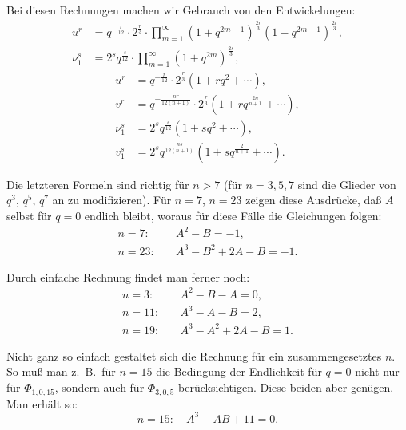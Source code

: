 \documentclass[12pt,a4paper]{article}
\theoremstyle{definition}
\begin{document}
Bei diesen Rechnungen machen wir Gebrauch von den Entwickelungen:
\[
\begin{aligned}
u^r &= q^{-\frac{r}{12}} \cdot 2^{\frac{r}{3}} \cdot \prod_{m=1}^{\infty} (1 + q^{2m-1})^{\frac{2r}{3}} (1 - q^{2m-1})^{\frac{2r}{3}}, \\
\nu_1^s &= 2^s q^{\frac{s}{12}} \cdot \prod_{m=1}^{\infty} (1 + q^{2m})^{\frac{2s}{3}},
\end{aligned}
\]
\begin{equation}\label{eq:75-6}
\begin{aligned}
u^r &= q^{-\frac{r}{12}} \cdot 2^{\frac{r}{3}} (1 + rq^2 + \cdots), \\
v^r &= q^{-\frac{nr}{12(n+1)}} \cdot 2^{\frac{r}{3}} (1 + rq^{\frac{2n}{n+1}} + \cdots), \\
\nu_1^s &= 2^s q^{\frac{s}{12}} (1 + sq^2 + \cdots), \\
v_1^s &= 2^s q^{\frac{ns}{12(n+1)}} (1 + sq^{\frac{2}{n+1}} + \cdots).
\end{aligned}
\end{equation}

Die letzteren Formeln sind richtig für $n > 7$ (für $n = 3, 5, 7$ sind die Glieder von $q^3$, $q^5$, $q^7$ an zu modifizieren). Für $n = 7$, $n = 23$ zeigen diese Ausdrücke, daß $A$ selbst für $q = 0$ endlich bleibt, woraus für diese Fälle die Gleichungen folgen:
\begin{equation}\label{eq:75-8}
\begin{aligned}
n = 7:\quad &A^2 - B = -1, \\
n = 23:\quad &A^3 - B^2 + 2A - B = -1.
\end{aligned}
\end{equation}

Durch einfache Rechnung findet man ferner noch:
\begin{equation}\label{eq:75-9}
\begin{aligned}
n = 3:\quad &A^2 - B - A = 0, \\
n = 11:\quad &A^3 - A - B = 2, \\
n = 19:\quad &A^3 - A^2 + 2A - B = 1.
\end{aligned}
\end{equation}

Nicht ganz so einfach gestaltet sich die Rechnung für ein zusammengesetztes $n$. So muß man z.~B.\ für $n = 15$ die Bedingung der Endlichkeit für $q = 0$ nicht nur für $\Phi_{1,0,15}$, sondern auch für $\Phi_{3,0,5}$ berücksichtigen. Diese beiden aber genügen. Man erhält so:
\begin{equation}\label{eq:75-10}
n = 15:\quad A^3 - AB + 11 = 0.
\end{equation}
\end{document}
